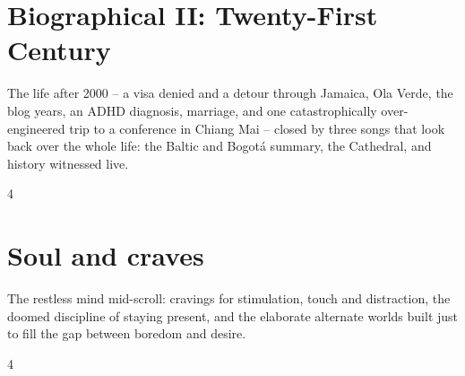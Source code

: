 \documentclass[a4paper,landscape]{memoir}
\begin{document}
\chapter{Biographical II: Twenty-First Century}
The life after 2000 -- a visa denied and a detour through Jamaica, Ola Verde, the blog years, an ADHD diagnosis, marriage, and one catastrophically over-engineered trip to a conference in Chiang Mai -- closed by three songs that look back over the whole life: the Baltic and Bogotá summary, the Cathedral, and history witnessed live.
\clearpage\begin{multicols*}{4}















\end{multicols*}

\chapter{Soul and craves}
The restless mind mid-scroll: cravings for stimulation, touch and distraction, the doomed discipline of staying present, and the elaborate alternate worlds built just to fill the gap between boredom and desire.
\clearpage\begin{multicols*}{4}



















\end{multicols*}
\end{document}
